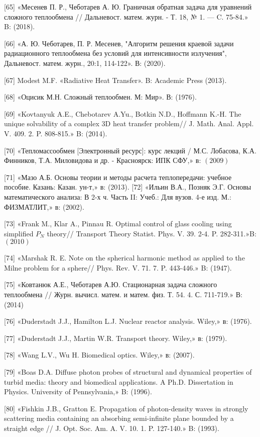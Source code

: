 \documentclass[10pt]{article}
\begin{document}
[65] «Месенев П. Р., Чеботарев А. Ю. Граничная обратная задача для уравнений сложного теплообмена // Дальневост. матем. журн. - Т. 18, № 1. — C. 75-84.» B: (2018).

[66] «А. Ю. Чеботарев, П. Р. Месенев, "Алгоритм решения краевой задачи радиационного теплообмена без условий для интенсивности излучения", Дальневост. матем. журн., 20:1, 114-122». В: (2020).

[67] Modest M.F. «Radiative Heat Transfer». B: Academic Press (2013).

[68] «Оцисик М.Н. Сложный теплообмен. М: Мир». В: (1976).

[69] «Kovtanyuk A.E., Chebotarev A.Yu., Botkin N.D., Hoffmann K.-H. The unique solvability of a complex 3D heat transfer problem// J. Math. Anal. Appl. V. 409. 2. P. 808-815.» B: (2014).

[70] «Тепломассообмен [Электронный ресурс]: курс лекций / М.С. Лобасова, К.А. Финников, Т.А. Миловидова и др. - Красноярск: ИПК СФУ,» в: $(2009)$

[71] «Мазо А.Б. Основы теории и методы расчета теплопередачи: учебное пособие. Казань: Казан. ун-т,» в: (2013). [72] «Ильин В.А., Позняк Э.Г. Основы математического анализа: В 2-х ч. Часть II: Учеб.: Для вузов. 4-е изд. М.: ФИЗМАТЛИТ,» в: (2002).

[73] «Frank M., Klar A., Pinnau R. Optimal control of glass cooling using simplified $P_{N}$ theory// Transport Theory Statist. Phys. V. 39. 2-4. P. 282-311.»B: $(2010)$

[74] «Marshak R. E. Note on the spherical harmonic method as applied to the Milne problem for a sphere// Phys. Rev. V. 71. 7. P. 443-446.» B: (1947).

[75] «Ковтанюк А.Е., Чеботарев А.Ю. Стационарная задача сложного теплообмена // Журн. вычисл. матем. и матем. физ. Т. 54. 4. С. 711-719.» В: (2014)

[76] «Duderstadt J.J., Hamilton L.J. Nuclear reactor analysis. Wiley,» в: (1976).

[77] «Duderstadt J.J., Martin W.R. Transport theory. Wiley,» в: (1979).

[78] «Wang L.V., Wu H. Biomedical optics. Wiley,» в: (2007).

[79] «Boas D.A. Diffuse photon probes of structural and dynamical properties of turbid media: theory and biomedical applications. A Ph.D. Dissertation in Physics. University of Pennsylvania,» B: (1996).

[80] «Fishkin J.B., Gratton E. Propagation of photon-density waves in strongly scattering media containing an absorbing semi-infinite plane bounded by a straight edge // J. Opt. Soc. Am. A. V. 10. 1. P. 127-140.» B: (1993).
\end{document}
